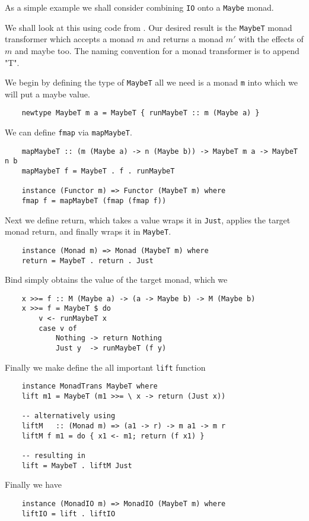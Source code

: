 \begin{example}
    As a simple example we shall consider
    combining \texttt{IO} onto a \texttt{Maybe} monad.

    We shall look at this using code from \cite{haskellT}.
    Our desired result is the \texttt{MaybeT} monad transformer
    which accepts a monad $m$ and returns a monad $m\prime$
    with the effects of $m$ and maybe too.
    The naming convention for a monad transformer is to append "T".

    We begin by defining the type of \texttt{MaybeT}
    all we need is a monad \texttt{m} into which we will
    put a maybe value.
    \begin{verbatim}
    newtype MaybeT m a = MaybeT { runMaybeT :: m (Maybe a) }
    \end{verbatim}

    We can define \texttt{fmap} via \texttt{mapMaybeT}.
    \begin{verbatim}
    mapMaybeT :: (m (Maybe a) -> n (Maybe b)) -> MaybeT m a -> MaybeT n b
    mapMaybeT f = MaybeT . f . runMaybeT

    instance (Functor m) => Functor (MaybeT m) where
    fmap f = mapMaybeT (fmap (fmap f))
    \end{verbatim}
    Next we define return,
    which takes a value wraps it in \texttt{Just},
    applies the target monad return,
    and finally wraps it in \texttt{MaybeT}.
    \begin{verbatim}
    instance (Monad m) => Monad (MaybeT m) where
    return = MaybeT . return . Just
    \end{verbatim}
    Bind simply obtains the value of the target monad,
    which we 
    \begin{verbatim}
    x >>= f :: M (Maybe a) -> (a -> Maybe b) -> M (Maybe b)
    x >>= f = MaybeT $ do
        v <- runMaybeT x
        case v of
            Nothing -> return Nothing
            Just y  -> runMaybeT (f y)
    \end{verbatim}
    Finally we make define the all important \texttt{lift} function
    \begin{verbatim}
    instance MonadTrans MaybeT where
    lift m1 = MaybeT (m1 >>= \ x -> return (Just x))

    -- alternatively using
    liftM   :: (Monad m) => (a1 -> r) -> m a1 -> m r
    liftM f m1 = do { x1 <- m1; return (f x1) }

    -- resulting in
    lift = MaybeT . liftM Just
    \end{verbatim}

    Finally we have
    \begin{verbatim}
    instance (MonadIO m) => MonadIO (MaybeT m) where
    liftIO = lift . liftIO
    \end{verbatim}
\end{example}

